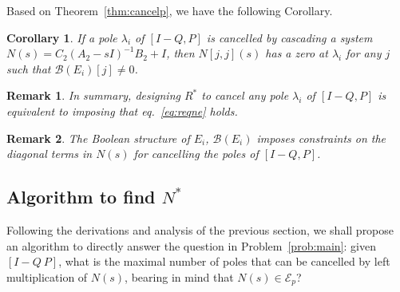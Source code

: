\documentclass[twocolumn,12pt]{autart}
\theoremstyle{plain}
\newtheorem{corollary}{Corollary}
\newtheorem{remark}{Remark}
\begin{document}
Based on Theorem~\ref{thm:cancelp}, we have the following Corollary.
\begin{corollary}\label{coro:cancelp}
If a pole $\lambda_i$ of $[I-{Q},{P}]$ is cancelled by cascading a system ${N}(s)={C}_2({A}_2-sI)^{-1}{B}_2+{I}$, then $N[j,j](s)$ has a zero at $\lambda_i$ for any $j$ such that $\mathcal{B}(E_i)[j]\neq0$.
\end{corollary}

\begin{remark}
In summary, designing ${R}^*$ to cancel any pole
$\lambda_i$ of $[I-{Q},{P}]$ is equivalent to imposing that
eq.~\eqref{eq:reqne} holds. 
\end{remark}

\begin{remark}
The Boolean structure of $E_i$, $\mathcal{B}({E}_i)$ imposes constraints on the diagonal terms in $N(s)$ for cancelling the poles of $[I-Q,P]$.
\end{remark}


\subsection{Algorithm to find $N^*$}\label{se:4.2}
Following the derivations and analysis of the previous section, we shall propose an algorithm to directly answer the question in Problem~\ref{prob:main}: given $[I-{Q}~{P}]$, what is the maximal number of poles that can be cancelled by left multiplication of ${N}(s)$, bearing in mind that $N(s)\in\mathcal{E}_p$? 
\end{document}

